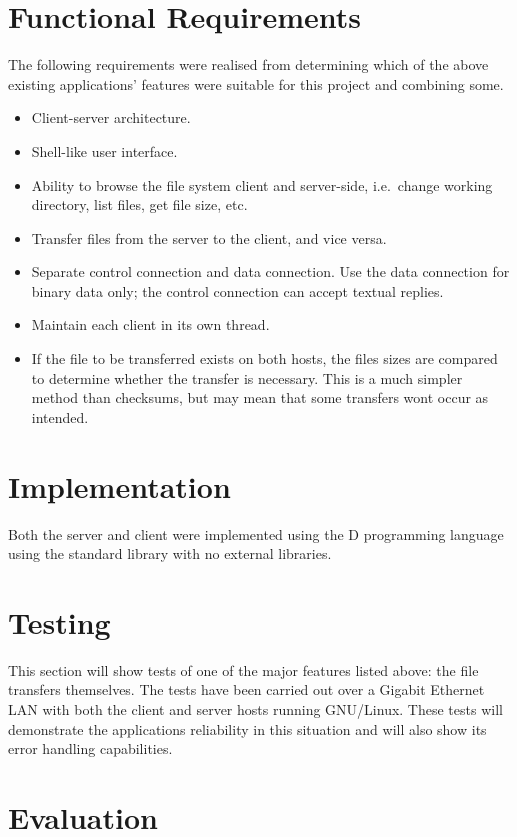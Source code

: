 \documentclass[a4paper]{article}
\begin{document}
\section{Functional Requirements}

The following requirements were realised from determining which of the above existing applications' features were suitable for this project and combining some.

\begin{itemize}
 \item Client-server architecture.
 \item Shell-like user interface.
 \item Ability to browse the file system client and server-side, i.e.\ change working directory, list files, get file size, etc.
 \item Transfer files from the server to the client, and vice versa.
 \item Separate control connection and data connection. Use the data connection for binary data only; the control connection can accept textual replies.
 \item Maintain each client in its own thread.
 \item If the file to be transferred exists on both hosts, the files sizes are compared to determine whether the transfer is necessary. This is a much simpler method than checksums, but may mean that some transfers wont occur as intended.
\end{itemize}

\section{Implementation}

Both the server and client were implemented using the D programming language \cite{dlang} using the standard library with no external libraries.

\section{Testing}

This section will show tests of one of the major features listed above: the file transfers themselves. The tests have been carried out over a Gigabit Ethernet LAN with both the client and server hosts running GNU/Linux. These tests will demonstrate the applications reliability in this situation and will also show its error handling capabilities.



\section{Evaluation}

\printbibliography
\end{document}
